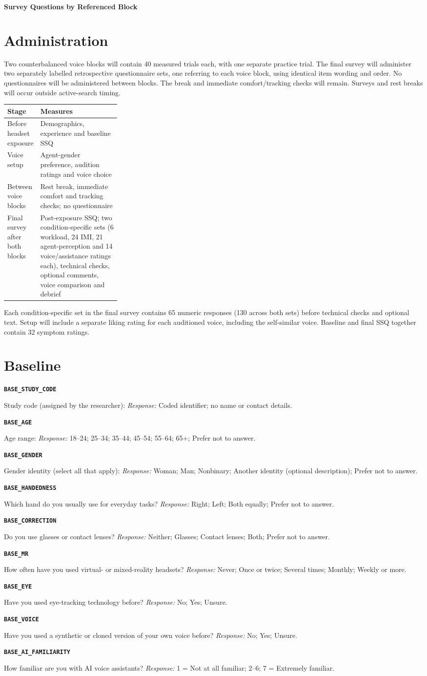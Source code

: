 \documentclass[11pt,letterpaper]{article}
\newcommand{\qid}[1]{\par\smallskip\textbf{\texttt{#1}}\par}
\begin{document}
{\LARGE\bfseries Survey Questions by Referenced Block}\par
\section{Administration}
Two counterbalanced voice blocks will contain 40 measured trials each, with one separate practice trial. The final survey will administer two separately labelled retrospective questionnaire sets, one referring to each voice block, using identical item wording and order. No questionnaires will be administered between blocks. The break and immediate comfort/tracking checks will remain. Surveys and rest breaks will occur outside active-search timing.

\begin{tabularx}{\linewidth}{@{}p{0.27\linewidth}X@{}}\toprule
Stage & Measures \\\midrule
Before headset exposure & Demographics, experience and baseline SSQ \\
Voice setup & Agent-gender preference, audition ratings and voice choice \\
Between voice blocks & Rest break, immediate comfort and tracking checks; no questionnaire \\
Final survey after both blocks & Post-exposure SSQ; two condition-specific sets (6 workload, 24 IMI, 21 agent-perception and 14 voice/assistance ratings each), technical checks, optional comments, voice comparison and debrief \\\bottomrule
\end{tabularx}
Each condition-specific set in the final survey contains 65 numeric responses (130 across both sets) before technical checks and optional text. Setup will include a separate liking rating for each auditioned voice, including the self-similar voice. Baseline and final SSQ together contain 32 symptom ratings.

\section{Baseline}
\qid{BASE\_STUDY\_CODE}
Study code (assigned by the researcher):
\textit{Response:} Coded identifier; no name or contact details.
\qid{BASE\_AGE}
Age range:
\textit{Response:} 18--24; 25--34; 35--44; 45--54; 55--64; 65+; Prefer not to answer.
\qid{BASE\_GENDER}
Gender identity (select all that apply):
\textit{Response:} Woman; Man; Nonbinary; Another identity (optional description); Prefer not to answer.
\qid{BASE\_HANDEDNESS}
Which hand do you usually use for everyday tasks?
\textit{Response:} Right; Left; Both equally; Prefer not to answer.
\qid{BASE\_CORRECTION}
Do you use glasses or contact lenses?
\textit{Response:} Neither; Glasses; Contact lenses; Both; Prefer not to answer.
\qid{BASE\_MR}
How often have you used virtual- or mixed-reality headsets?
\textit{Response:} Never; Once or twice; Several times; Monthly; Weekly or more.
\qid{BASE\_EYE}
Have you used eye-tracking technology before?
\textit{Response:} No; Yes; Unsure.
\qid{BASE\_VOICE}
Have you used a synthetic or cloned version of your own voice before?
\textit{Response:} No; Yes; Unsure.
\qid{BASE\_AI\_FAMILIARITY}
How familiar are you with AI voice assistants?
\textit{Response:} 1 = Not at all familiar; 2--6; 7 = Extremely familiar.
\end{document}
